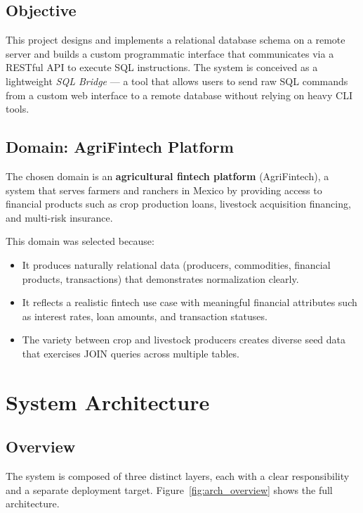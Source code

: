 \documentclass[12pt, a4paper]{article}
\begin{document}
\subsection{Objective}

This project designs and implements a relational database schema on a remote server and
builds a custom programmatic interface that communicates via a RESTful API to execute
SQL instructions. The system is conceived as a lightweight \textit{SQL Bridge} — a tool
that allows users to send raw SQL commands from a custom web interface to a remote
database without relying on heavy CLI tools.

\subsection{Domain: AgriFintech Platform}

The chosen domain is an \textbf{agricultural fintech platform} (AgriFintech), a system
that serves farmers and ranchers in Mexico by providing access to financial products
such as crop production loans, livestock acquisition financing, and multi-risk insurance.

This domain was selected because:
\begin{itemize}[leftmargin=1.5em]
  \item It produces naturally relational data (producers, commodities, financial products,
        transactions) that demonstrates normalization clearly.
  \item It reflects a realistic fintech use case with meaningful financial attributes
        such as interest rates, loan amounts, and transaction statuses.
  \item The variety between crop and livestock producers creates diverse seed data that
        exercises JOIN queries across multiple tables.
\end{itemize}

\section{System Architecture}

\subsection{Overview}

The system is composed of three distinct layers, each with a clear responsibility and a
separate deployment target. Figure~\ref{fig:arch_overview} shows the full architecture.
\end{document}
